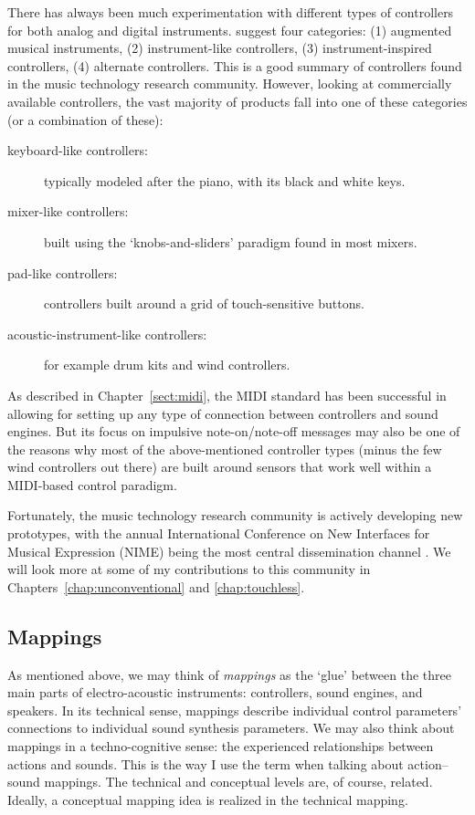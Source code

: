 There has always been much experimentation with different types of controllers for both analog and digital instruments. \citet{miranda_new_2006} suggest four categories: (1) augmented musical instruments, (2) instrument-like controllers, (3) instrument-inspired controllers, (4) alternate controllers. This is a good summary of controllers found in the music technology research community. However, looking at commercially available controllers, the vast majority of products fall into one of these categories (or a combination of these):

\begin{description}
	\item[keyboard-like controllers:] typically modeled after the piano, with its black and white keys.
	\item[mixer-like controllers:] built using the `knobs-and-sliders' paradigm found in most mixers.
	\item[pad-like controllers:] controllers built around a grid of touch-sensitive buttons.
  \item[acoustic-instrument-like controllers:] for example drum kits and wind controllers.
\end{description}

As described in Chapter~\ref{sect:midi}, the MIDI standard has been successful in allowing for setting up any type of connection between controllers and sound engines. But its focus on impulsive note-on/note-off messages may also be one of the reasons why most of the above-mentioned controller types (minus the few wind controllers out there) are built around sensors that work well within a MIDI-based control paradigm.

Fortunately, the music technology research community is actively developing new prototypes, with the annual International Conference on New Interfaces for Musical Expression (NIME) being the most central dissemination channel \citep{jensenius_nime_2017}. We will look more at some of my contributions to this community in Chapters~\ref{chap:unconventional} and \ref{chap:touchless}.


\subsection{Mappings}

As mentioned above, we may think of \emph{mappings} as the `glue' between the three main parts of electro-acoustic instruments: controllers, sound engines, and speakers. In its technical sense, mappings describe individual control parameters' connections to individual sound synthesis parameters. We may also think about mappings in a techno-cognitive sense: the experienced relationships between actions and sounds. This is the way I use the term when talking about action--sound mappings. The technical and conceptual levels are, of course, related. Ideally, a conceptual mapping idea is realized in the technical mapping.

